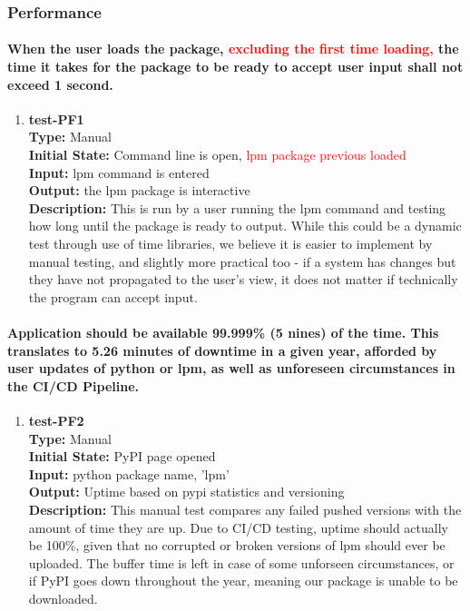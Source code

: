 \documentclass[12pt, titlepage]{article}
\begin{document}
\subsubsection{Performance}
\paragraph{When the user loads the package, \textcolor{red}{excluding the first time loading,} the time it takes for the package to be ready to accept user input shall not exceed 1 second.}
\begin{enumerate}
    \item{\textbf{test-PF1}\\}
    \textbf{Type:} Manual\\
    \textbf{Initial State: } Command line is open, \textcolor{red}{lpm package previous loaded}\\
    \textbf{Input:} lpm command is entered\\
    \textbf{Output:} the lpm package is interactive \\
    \textbf{Description:} This is run by a user running the lpm command and testing how long until the package is ready to output. While this could be a dynamic test through use of time libraries, we believe it is easier to implement by manual testing, and slightly more practical too - if a system has changes but they have not propagated to the user's view, it does not matter if technically the program can accept input. \\
\end{enumerate}

\paragraph{Application should be available 99.999\% (5 nines) of the time. This translates
to 5.26 minutes of downtime in a given year, afforded by user updates of python or lpm,
as well as unforeseen circumstances in the CI/CD Pipeline.}
\begin{enumerate}
    \item{\textbf{test-PF2}\\}
    \textbf{Type:} Manual\\
    \textbf{Initial State:} PyPI page opened\\
    \textbf{Input:} python package name, 'lpm'\\
    \textbf{Output:} Uptime based on pypi statistics and versioning\\
    \textbf{Description:} This manual test compares any failed pushed versions with the amount of time they are up. Due to CI/CD testing, uptime should actually be 100\%, given that no corrupted or broken versions of lpm should ever be uploaded. The buffer time is left in case of some unforseen circumstances, or if PyPI goes down throughout the year, meaning our package is unable to be downloaded.\\
\end{enumerate}
\end{document}
